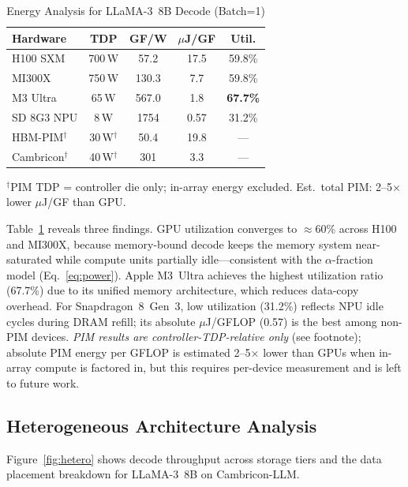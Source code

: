 \documentclass[journal]{IEEEtran}
\begin{document}
\begin{table}[t]
\centering
\caption{Energy Analysis for LLaMA-3~8B Decode (Batch=1)}
\label{tab:energy}
\renewcommand{\arraystretch}{1.1}
\small
\setlength{\tabcolsep}{3pt}
\begin{tabular}{@{}lcccc@{}}
\toprule
\textbf{Hardware} & \textbf{TDP} & \textbf{GF/W} & \textbf{$\mu$J/GF} & \textbf{Util.} \\
\midrule
H100 SXM         & 700\,W & 57.2  & 17.5 & 59.8\% \\
MI300X           & 750\,W & 130.3 & 7.7  & 59.8\% \\
M3 Ultra         & 65\,W  & 567.0 & 1.8  & \textbf{67.7\%} \\
SD 8G3 NPU       & 8\,W   & 1754  & 0.57 & 31.2\% \\
\midrule
HBM-PIM$^\dag$   & 30\,W$^\dag$ & 50.4  & 19.8 & --- \\
Cambricon$^\dag$  & 40\,W$^\dag$ & 301   & 3.3  & --- \\
\bottomrule
\end{tabular}

\vspace{1pt}
{\scriptsize
$^\dag$PIM TDP = controller die only; in-array energy excluded.
Est.\ total PIM: 2--5$\times$ lower $\mu$J/GF than GPU.}
\end{table}

Table~\ref{tab:energy} reveals three findings.
GPU utilization converges to $\approx$60\% across H100 and MI300X,
because memory-bound decode keeps the memory system near-saturated
while compute units partially idle---consistent with the $\alpha$-fraction
model (Eq.~\ref{eq:power}).
Apple M3~Ultra achieves the highest utilization ratio (67.7\%) due to
its unified memory architecture, which reduces data-copy overhead.
For Snapdragon~8~Gen~3, low utilization (31.2\%) reflects NPU idle
cycles during DRAM refill; its absolute $\mu$J/GFLOP (0.57) is
the best among non-PIM devices.
\emph{PIM results are controller-TDP-relative only} (see footnote);
absolute PIM energy per GFLOP is estimated 2--5$\times$ lower than GPUs
when in-array compute is factored in, but this requires per-device
measurement and is left to future work.

\subsection{Heterogeneous Architecture Analysis}

Figure~\ref{fig:hetero} shows decode throughput across storage tiers and
the data placement breakdown for LLaMA-3~8B on Cambricon-LLM.
\end{document}
